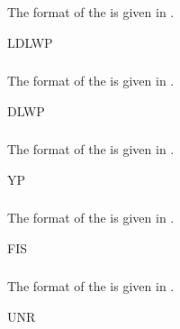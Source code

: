 \subsubsection{}\label{sec:LDLWPBlock}
The format of the  is given in .
\begin{BlockTable}{LDLWP}
  \label{tab:LDLWPBlock}
\end{BlockTable}

\subsubsection{}\label{sec:DLWPBlock}
The format of the  is given in .
\begin{BlockTable}{DLWP}
  \label{tab:DLWPBlock}
\end{BlockTable}

\subsubsection{}\label{sec:YPBlock}
The format of the  is given in .
\begin{BlockTable}{YP}
  \label{tab:YPBlock}
\end{BlockTable}

\subsubsection{}\label{sec:FISBlock}
The format of the  is given in .
\begin{BlockTable}{FIS}
  \label{tab:FISBlock}
\end{BlockTable}

\subsubsection{}\label{sec:UNRBlock}
The format of the  is given in .
\begin{BlockTable}{UNR}
  \label{tab:UNRBlock}
\end{BlockTable}
